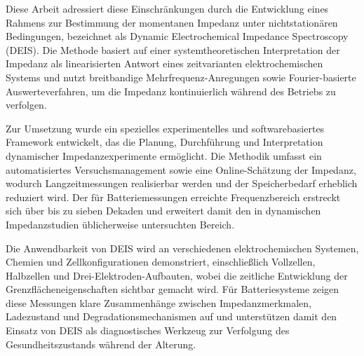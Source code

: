Diese Arbeit adressiert diese Einschränkungen durch die Entwicklung eines Rahmens zur Bestimmung der momentanen Impedanz unter nichtstationären Bedingungen, bezeichnet als Dynamic Electrochemical Impedance Spectroscopy (DEIS). Die Methode basiert auf einer systemtheoretischen Interpretation der Impedanz als linearisierten Antwort eines zeitvarianten elektrochemischen Systems und nutzt breitbandige Mehrfrequenz-Anregungen sowie Fourier-basierte Auswerteverfahren, um die Impedanz kontinuierlich während des Betriebs zu verfolgen.

Zur Umsetzung wurde ein spezielles experimentelles und softwarebasiertes Framework entwickelt, das die Planung, Durchführung und Interpretation dynamischer Impedanzexperimente ermöglicht. Die Methodik umfasst ein automatisiertes Versuchsmanagement sowie eine Online-Schätzung der Impedanz, wodurch Langzeitmessungen realisierbar werden und der Speicherbedarf erheblich reduziert wird. Der für Batteriemessungen erreichte Frequenzbereich erstreckt sich über bis zu sieben Dekaden und erweitert damit den in dynamischen Impedanzstudien üblicherweise untersuchten Bereich.

Die Anwendbarkeit von DEIS wird an verschiedenen elektrochemischen Systemen, Chemien und Zellkonfigurationen demonstriert, einschließlich Vollzellen, Halbzellen und Drei-Elektroden-Aufbauten, wobei die zeitliche Entwicklung der Grenzflächeneigenschaften sichtbar gemacht wird. Für Batteriesysteme zeigen diese Messungen klare Zusammenhänge zwischen Impedanzmerkmalen, Ladezustand und Degradationsmechanismen auf und unterstützen damit den Einsatz von DEIS als diagnostisches Werkzeug zur Verfolgung des Gesundheitszustands während der Alterung.